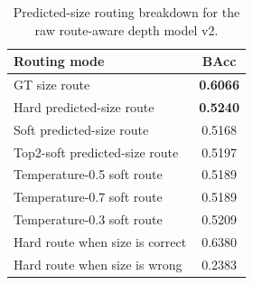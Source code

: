 \begin{table}[t]
\caption{Predicted-size routing breakdown for the raw route-aware depth model v2.}
\label{tab:routing_breakdown}
\centering
\begin{tabular}{p{}c}
\toprule
Routing mode & BAcc \\
\midrule
GT size route & \textbf{0.6066} \\
Hard predicted-size route & \textbf{0.5240} \\
Soft predicted-size route & 0.5168 \\
Top2-soft predicted-size route & 0.5197 \\
Temperature-0.5 soft route & 0.5189 \\
Temperature-0.7 soft route & 0.5189 \\
Temperature-0.3 soft route & 0.5209 \\
Hard route when size is correct & 0.6380 \\
Hard route when size is wrong & 0.2383 \\
\bottomrule
\end{tabular}
\end{table}
